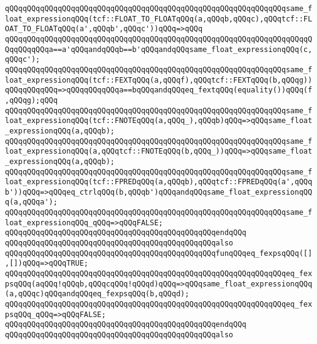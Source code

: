 \verb|qQQqqQQqqQQqqQQqqQQqqQQqqQQqqQQqqQQqqQQqqQQqqQQqqQQqqQQqqQQqqQQqsame_float_expressionqQQq(tcf::FLOAT_TO_FLOATqQQq(a,qQQqb,qQQqc),qQQqtcf::FLOAT_TO_FLOATqQQq(a',qQQqb',qQQqc'))qQQq=>qQQq|\newline
\verb|qQQqqQQqqQQqqQQqqQQqqQQqqQQqqQQqqQQqqQQqqQQqqQQqqQQqqQQqqQQqqQQqqQQqqQQqqQQqqQQqa==a'qQQqandqQQqb==b'qQQqandqQQqsame_float_expressionqQQq(c,qQQqc');|\newline
\verb|qQQqqQQqqQQqqQQqqQQqqQQqqQQqqQQqqQQqqQQqqQQqqQQqqQQqqQQqqQQqqQQqsame_float_expressionqQQq(tcf::FEXTqQQq(a,qQQqf),qQQqtcf::FEXTqQQq(b,qQQqg))qQQqqQQqqQQq=>qQQqqQQqqQQqa==bqQQqandqQQqeq_fextqQQq(equality())qQQq(f,qQQqg);qQQq|\newline
\verb|qQQqqQQqqQQqqQQqqQQqqQQqqQQqqQQqqQQqqQQqqQQqqQQqqQQqqQQqqQQqqQQqsame_float_expressionqQQq(tcf::FNOTEqQQq(a,qQQq_),qQQqb)qQQq=>qQQqsame_float_expressionqQQq(a,qQQqb);|\newline
\verb|qQQqqQQqqQQqqQQqqQQqqQQqqQQqqQQqqQQqqQQqqQQqqQQqqQQqqQQqqQQqqQQqsame_float_expressionqQQq(a,qQQqtcf::FNOTEqQQq(b,qQQq_))qQQq=>qQQqsame_float_expressionqQQq(a,qQQqb);|\newline
\verb|qQQqqQQqqQQqqQQqqQQqqQQqqQQqqQQqqQQqqQQqqQQqqQQqqQQqqQQqqQQqqQQqsame_float_expressionqQQq(tcf::FPREDqQQq(a,qQQqb),qQQqtcf::FPREDqQQq(a',qQQqb'))qQQq=>qQQqeq_ctrlqQQq(b,qQQqb')qQQqandqQQqsame_float_expressionqQQq(a,qQQqa');|\newline
\verb|qQQqqQQqqQQqqQQqqQQqqQQqqQQqqQQqqQQqqQQqqQQqqQQqqQQqqQQqqQQqqQQqsame_float_expressionqQQq_qQQq=>qQQqFALSE;|\newline
\verb|qQQqqQQqqQQqqQQqqQQqqQQqqQQqqQQqqQQqqQQqqQQqqQQqendqQQq|\newline
\newline
\verb|qQQqqQQqqQQqqQQqqQQqqQQqqQQqqQQqqQQqqQQqqQQqqQQqalso|\newline
\verb|qQQqqQQqqQQqqQQqqQQqqQQqqQQqqQQqqQQqqQQqqQQqqQQqfunqQQqeq_fexpsqQQq([],[])qQQq=>qQQqTRUE;|\newline
\verb|qQQqqQQqqQQqqQQqqQQqqQQqqQQqqQQqqQQqqQQqqQQqqQQqqQQqqQQqqQQqqQQqeq_fexpsqQQq(aqQQq!qQQqb,qQQqcqQQq!qQQqd)qQQq=>qQQqsame_float_expressionqQQq(a,qQQqc)qQQqandqQQqeq_fexpsqQQq(b,qQQqd);|\newline
\verb|qQQqqQQqqQQqqQQqqQQqqQQqqQQqqQQqqQQqqQQqqQQqqQQqqQQqqQQqqQQqqQQqeq_fexpsqQQq_qQQq=>qQQqFALSE;|\newline
\verb|qQQqqQQqqQQqqQQqqQQqqQQqqQQqqQQqqQQqqQQqqQQqqQQqendqQQq|\newline
\newline
\verb|qQQqqQQqqQQqqQQqqQQqqQQqqQQqqQQqqQQqqQQqqQQqqQQqalso|\newline
